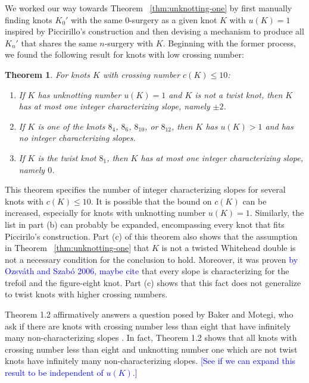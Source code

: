 \documentclass[11pt,usenames,dvipsnames,reqno]{amsart}
\newtheorem{theorem}{Theorem}
\numberwithin{theorem}{section}
\theoremstyle{ex}
\theoremstyle{rem}
\def\kh#1{\textcolor{Blue}{#1}}
\begin{document}
We worked our way towards Theorem ~\ref{thm:unknotting-one} by first manually finding knots $K_{0}'$ with the same $0$-surgery as a given knot $K$ with $u(K)=1$ inspired by Piccirillo's construction and then devising a mechanism to produce all $K_n'$ that shares the same $n$-surgery with $K$. Beginning with the former process, we found the following result for knots with low crossing number:

\begin{theorem}\label{thm:low-crossing} For knots $K$ with crossing number $c(K) \leq 10$:
	\begin{enumerate}[label=\normalfont \bf (\alph*)]
		\item If $K$ has unknotting number $u(K)=1$ and $K$ is not a twist knot, then $K$ has at most one integer characterizing slope, namely $\pm 2$.
		\item If $K$ is one of the knots $8_4$, $8_6$, $8_{10}$, or $8_{12}$, then $K$ has $u(K)>1$ and has no integer characterizing slopes.
		\item If $K$ is the twist knot $8_1$, then $K$ has at most one integer characterizing slope, namely $0$.
	\end{enumerate}
\end{theorem}

This theorem specifies the number of integer characterizing slopes for several knots with $c(K) \leq 10$. It is possible that the bound on $c(K)$ can be increased, especially for knots with unknotting number $u(K) = 1$. Similarly, the list in part (b) can probably be expanded, encompassing every knot that fits Piccirilo's construction. Part (c) of this theorem also shows that the assumption in Theorem ~\ref{thm:unknotting-one} that $K$ is not a twisted Whitehead double is not a necessary condition for the conclusion to hold. Moreover, it was proven \kh{by Ozsv\'{a}th and Szab\'{o} 2006, maybe cite}  that every slope is characterizing for the trefoil and the figure-eight knot. Part (c) shows that this fact does not generalize to twist knots with higher crossing numbers.

Theorem 1.2 affirmatively answers a question posed by Baker and Motegi, who ask if there are knots with crossing number less than eight that have infinitely many non-characterizing slopes \cite[Question~1.7]{baker-motegi}. In fact, Theorem 1.2 shows that all knots with crossing number less than eight and unknotting number one which are not twist knots have infinitely many non-characterizing slopes. \kh{[See if we can expand this result to be independent of $u(K)$.]}
\end{document}
